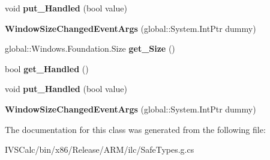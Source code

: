 \begin{DoxyCompactItemize}
void {\bfseries put\+\_\+\+Handled} (bool value)
\item 
\mbox{\label{class_windows_1_1_u_i_1_1_core_1_1_window_size_changed_event_args_ad2d367e9eae149917697992f05763f8e}} 
{\bfseries Window\+Size\+Changed\+Event\+Args} (global\+::\+System.\+Int\+Ptr dummy)
\item 
\mbox{\label{class_windows_1_1_u_i_1_1_core_1_1_window_size_changed_event_args_adb9511c374eca59b6ea8bd3304b2d29a}} 
global\+::\+Windows.\+Foundation.\+Size {\bfseries get\+\_\+\+Size} ()
\item 
\mbox{\label{class_windows_1_1_u_i_1_1_core_1_1_window_size_changed_event_args_ad2ed5746ca6426f34799617fd09e7654}} 
bool {\bfseries get\+\_\+\+Handled} ()
\item 
\mbox{\label{class_windows_1_1_u_i_1_1_core_1_1_window_size_changed_event_args_a7a3ef8971cccc5897d36da53a0d08050}} 
void {\bfseries put\+\_\+\+Handled} (bool value)
\item 
\mbox{\label{class_windows_1_1_u_i_1_1_core_1_1_window_size_changed_event_args_ad2d367e9eae149917697992f05763f8e}} 
{\bfseries Window\+Size\+Changed\+Event\+Args} (global\+::\+System.\+Int\+Ptr dummy)
\end{DoxyCompactItemize}


The documentation for this class was generated from the following file\+:\begin{DoxyCompactItemize}
\item 
I\+V\+S\+Calc/bin/x86/\+Release/\+A\+R\+M/ilc/Safe\+Types.\+g.\+cs\end{DoxyCompactItemize}
